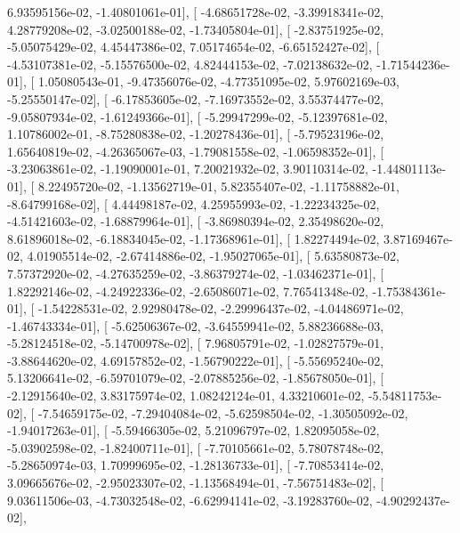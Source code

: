 \documentclass{article}
\begin{document}
          6.93595156e-02,  -1.40801061e-01],
       [ -4.68651728e-02,  -3.39918341e-02,   4.28779208e-02,
         -3.02500188e-02,  -1.73405804e-01],
       [ -2.83751925e-02,  -5.05075429e-02,   4.45447386e-02,
          7.05174654e-02,  -6.65152427e-02],
       [ -4.53107381e-02,  -5.15576500e-02,   4.82444153e-02,
         -7.02138632e-02,  -1.71544236e-01],
       [  1.05080543e-01,  -9.47356076e-02,  -4.77351095e-02,
          5.97602169e-03,  -5.25550147e-02],
       [ -6.17853605e-02,  -7.16973552e-02,   3.55374477e-02,
         -9.05807934e-02,  -1.61249366e-01],
       [ -5.29947299e-02,  -5.12397681e-02,   1.10786002e-01,
         -8.75280838e-02,  -1.20278436e-01],
       [ -5.79523196e-02,   1.65640819e-02,  -4.26365067e-03,
         -1.79081558e-02,  -1.06598352e-01],
       [ -3.23063861e-02,  -1.19090001e-01,   7.20021932e-02,
          3.90110314e-02,  -1.44801113e-01],
       [  8.22495720e-02,  -1.13562719e-01,   5.82355407e-02,
         -1.11758882e-01,  -8.64799168e-02],
       [  4.44498187e-02,   4.25955993e-02,  -1.22234325e-02,
         -4.51421603e-02,  -1.68879964e-01],
       [ -3.86980394e-02,   2.35498620e-02,   8.61896018e-02,
         -6.18834045e-02,  -1.17368961e-01],
       [  1.82274494e-02,   3.87169467e-02,   4.01905514e-02,
         -2.67414886e-02,  -1.95027065e-01],
       [  5.63580873e-02,   7.57372920e-02,  -4.27635259e-02,
         -3.86379274e-02,  -1.03462371e-01],
       [  1.82292146e-02,  -4.24922336e-02,  -2.65086071e-02,
          7.76541348e-02,  -1.75384361e-01],
       [ -1.54228531e-02,   2.92980478e-02,  -2.29996437e-02,
         -4.04486971e-02,  -1.46743334e-01],
       [ -5.62506367e-02,  -3.64559941e-02,   5.88236688e-03,
         -5.28124518e-02,  -5.14700978e-02],
       [  7.96805791e-02,  -1.02827579e-01,  -3.88644620e-02,
          4.69157852e-02,  -1.56790222e-01],
       [ -5.55695240e-02,   5.13206641e-02,  -6.59701079e-02,
         -2.07885256e-02,  -1.85678050e-01],
       [ -2.12915640e-02,   3.83175974e-02,   1.08242124e-01,
          4.33210601e-02,  -5.54811753e-02],
       [ -7.54659175e-02,  -7.29404084e-02,  -5.62598504e-02,
         -1.30505092e-02,  -1.94017263e-01],
       [ -5.59466305e-02,   5.21096797e-02,   1.82095058e-02,
         -5.03902598e-02,  -1.82400711e-01],
       [ -7.70105661e-02,   5.78078748e-02,  -5.28650974e-03,
          1.70999695e-02,  -1.28136733e-01],
       [ -7.70853414e-02,   3.09665676e-02,  -2.95023307e-02,
         -1.13568494e-01,  -7.56751483e-02],
       [  9.03611506e-03,  -4.73032548e-02,  -6.62994141e-02,
         -3.19283760e-02,  -4.90292437e-02],
\end{document}
